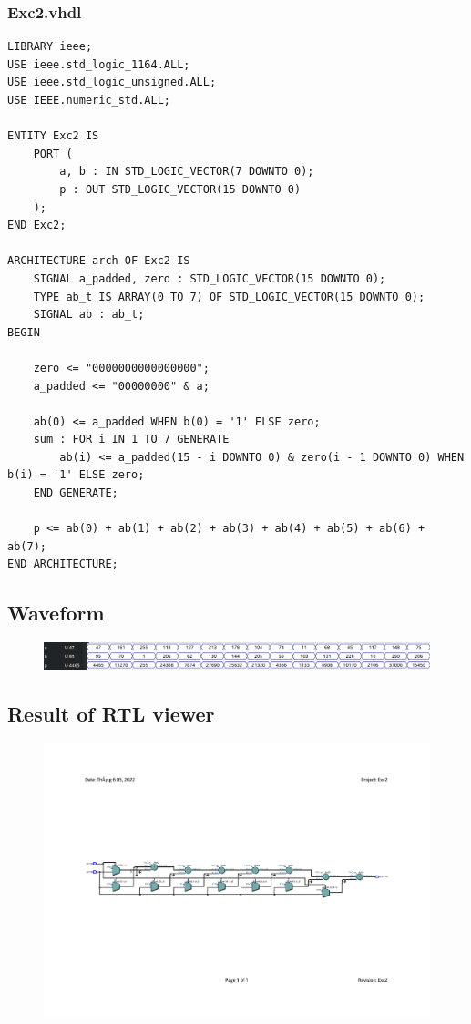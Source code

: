 \documentclass[13pt,a4paper]{report}
\begin{document}
\subsubsection{Exc2.vhdl}
\begin{verbatim}
LIBRARY ieee;
USE ieee.std_logic_1164.ALL;
USE ieee.std_logic_unsigned.ALL;
USE IEEE.numeric_std.ALL;

ENTITY Exc2 IS
	PORT (
		a, b : IN STD_LOGIC_VECTOR(7 DOWNTO 0);
		p : OUT STD_LOGIC_VECTOR(15 DOWNTO 0)
	);
END Exc2;

ARCHITECTURE arch OF Exc2 IS
	SIGNAL a_padded, zero : STD_LOGIC_VECTOR(15 DOWNTO 0);
	TYPE ab_t IS ARRAY(0 TO 7) OF STD_LOGIC_VECTOR(15 DOWNTO 0);
	SIGNAL ab : ab_t;
BEGIN

	zero <= "0000000000000000";
	a_padded <= "00000000" & a;

	ab(0) <= a_padded WHEN b(0) = '1' ELSE zero;
	sum : FOR i IN 1 TO 7 GENERATE
		ab(i) <= a_padded(15 - i DOWNTO 0) & zero(i - 1 DOWNTO 0) WHEN b(i) = '1' ELSE zero;
	END GENERATE;

	p <= ab(0) + ab(1) + ab(2) + ab(3) + ab(4) + ab(5) + ab(6) + ab(7);
END ARCHITECTURE;
\end{verbatim}

\subsection{Waveform}
\begin{figure}[H]
\centering
\includegraphics[scale=0.6]{images/Exc2_waveform.png}
\end{figure}

\subsection{Result of RTL viewer}
\begin{figure}[H]
\centering
\includegraphics[scale=0.78, clip, trim={3cm 8cm 3.2cm 9cm}]{images/Exc2_RTL.pdf}
\end{figure}
\end{document}
